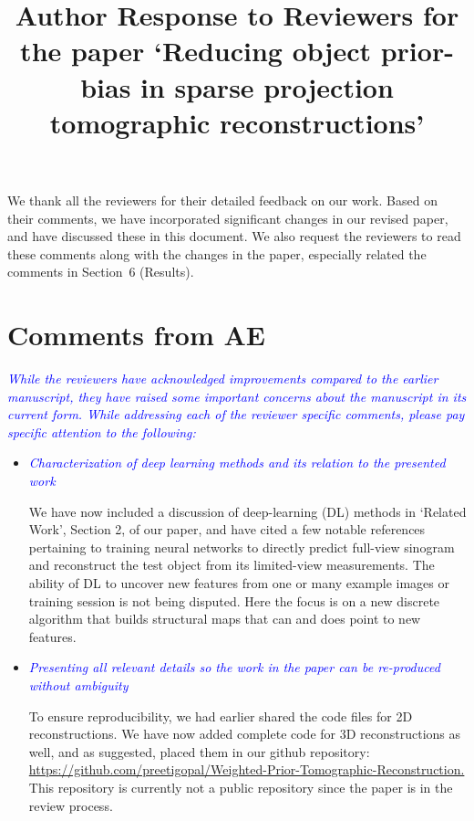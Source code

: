 \documentclass{article}
\title{Author Response to Reviewers for the paper `Reducing object prior-bias in sparse projection tomographic reconstructions'}
\begin{document}
\maketitle

We thank all the reviewers for their detailed feedback on our
work. Based on their comments, we have incorporated significant
changes in our revised paper, and have discussed these in this
document. We also request the reviewers to read these comments along
with the changes in the paper, especially related the comments in
Section~6 (Results).


\section{Comments from AE}

\textcolor{blue}{\textit{While the reviewers have acknowledged
    improvements compared to the earlier manuscript, they have raised
    some important concerns about the manuscript in its current
    form. While addressing each of the reviewer specific comments,
    please pay specific attention to the following:}} 

  \begin{itemize}
  \item \textcolor{blue}{\textit{Characterization of deep learning
        methods and its relation to the presented work}} 

    We have now included a discussion of deep-learning (DL) methods in
    `Related Work', Section 2, of our paper, and have cited a few
    notable references pertaining to training neural networks to
    directly predict full-view sinogram and reconstruct the test
    object from its limited-view measurements. The ability of DL to
    uncover new features from one or many example images or training
    session is not being disputed. Here the focus is on a new discrete
    algorithm that builds structural maps that can and does point to
    new features.

    \item\textcolor{blue}{\textit{Presenting all relevant details so
          the work in the paper can be re-produced without ambiguity}} 
      

      To ensure reproducibility, we had earlier shared the code files
      for 2D reconstructions. We have now added complete code for 3D
      reconstructions as well, and as suggested, placed them in our
      github repository:
      \url{https://github.com/preetigopal/Weighted-Prior-Tomographic-Reconstruction.}
      This repository is currently not a public repository since the
      paper is in the review process.

  \end{itemize}
\end{document}
